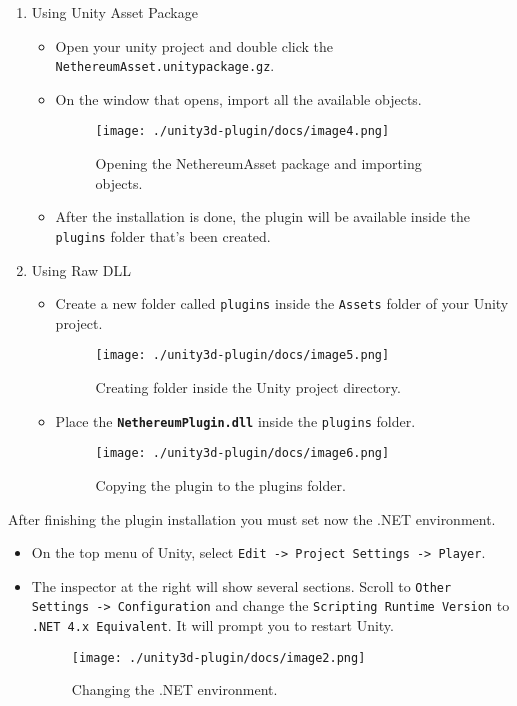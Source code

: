 \documentclass[a4paper, 11pt, titlepage]{article}
\begin{document}
\begin{enumerate}
\item Using Unity Asset Package

\begin{itemize}
\item Open your unity project and double click the \texttt{NethereumAsset.unitypackage.gz}.
\item On the window that opens, import all the available objects.

\begin{figure}[htbp]
\centering
\texttt{[image: ./unity3d-plugin/docs/image4.png]}
\caption{\label{fig:orgb63ead7}
Opening the NethereumAsset package and importing objects.}
\end{figure}

\item After the installation is done, the plugin will be available inside the \texttt{plugins} folder that's been created.
\end{itemize}

\item Using Raw DLL

\begin{itemize}
\item Create a new folder called \texttt{plugins} inside the \texttt{Assets} folder of your Unity project.

\begin{figure}[htbp]
\centering
\texttt{[image: ./unity3d-plugin/docs/image5.png]}
\caption{\label{fig:org49a69ca}
Creating folder inside the Unity project directory.}
\end{figure}

\item Place the \textbf{\texttt{NethereumPlugin.dll}} inside the \texttt{plugins} folder.

\begin{figure}[htbp]
\centering
\texttt{[image: ./unity3d-plugin/docs/image6.png]}
\caption{\label{fig:org280810e}
Copying the plugin to the plugins folder.}
\end{figure}
\end{itemize}
\end{enumerate}

After finishing the plugin installation you must set now the .NET environment.

\begin{itemize}
\item On the top menu of Unity, select \texttt{Edit -> Project Settings -> Player}.
\item The inspector at the right will show several sections. Scroll to \texttt{Other Settings -> Configuration} and change the \texttt{Scripting Runtime Version} to \texttt{.NET 4.x Equivalent}. It will prompt you to restart Unity.

\begin{figure}[htbp]
\centering
\texttt{[image: ./unity3d-plugin/docs/image2.png]}
\caption{\label{fig:orge1db561}
Changing the .NET environment.}
\end{figure}
\end{itemize}
\end{document}
